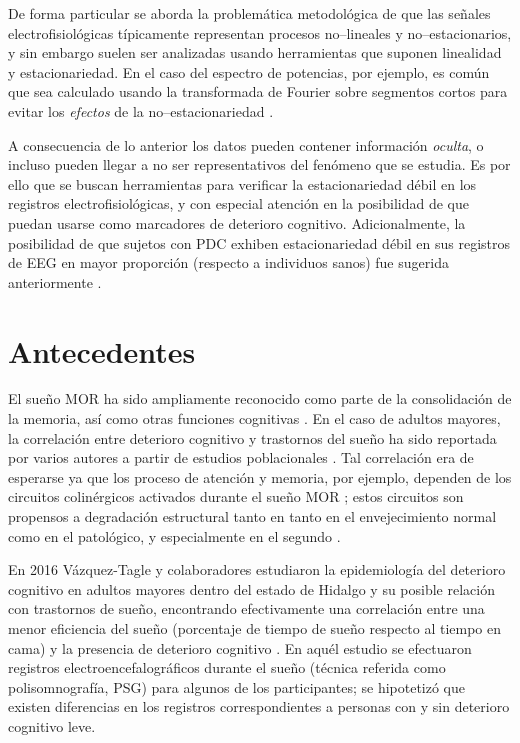 De forma particular se aborda la problemática metodológica de que las señales electrofisiológicas 
típicamente representan procesos no--lineales y no--estacionarios, y sin embargo suelen ser 
analizadas usando herramientas que suponen linealidad y estacionariedad.
%
En el caso del espectro de potencias, por ejemplo, es común que sea calculado usando la
transformada de Fourier sobre segmentos cortos para evitar los \textit{efectos} de la 
no--estacionariedad \cite{Kaiser00}.

A consecuencia de lo anterior los datos pueden contener información \textit{oculta}, o incluso 
pueden llegar a no ser representativos del fenómeno que se estudia. 
%
Es por ello que se buscan herramientas para verificar la estacionariedad débil en los registros
electrofisiológicas, y con especial atención en la posibilidad de que puedan usarse como marcadores
de deterioro cognitivo.
%
Adicionalmente, la posibilidad de que sujetos con PDC exhiben estacionariedad débil en sus 
registros de EEG en mayor proporción (respecto a individuos sanos) fue sugerida anteriormente
\cite{Cohen77}.


\section{Antecedentes}

El sueño MOR ha sido ampliamente reconocido como parte de la consolidación de la memoria, así como
otras funciones cognitivas 
\cite{Fishbein1971,Fishbein1977,Lucero1970,Pearlman1971,Pearlman1974,Smith1991}.
%
En el caso de adultos mayores, la correlación entre deterioro cognitivo y trastornos del sueño ha 
sido reportada por varios autores a partir de estudios poblacionales 
\cite{Amer13,Miyata13,Reid06,Potvin12}.
%
Tal correlación era de esperarse ya que los proceso de atención y memoria, por ejemplo, dependen de 
los circuitos colinérgicos activados durante el sueño MOR \cite{Braun1997}; estos circuitos son 
propensos a degradación estructural tanto en tanto en el envejecimiento normal como en el 
patológico,  y especialmente en el segundo \cite{Schliebs11}.

En 2016 Vázquez-Tagle y colaboradores estudiaron la epidemiología del deterioro cognitivo en 
adultos mayores dentro del estado de Hidalgo y su posible relación con trastornos de sueño, 
encontrando efectivamente una correlación entre una menor eficiencia del sueño (porcentaje de 
tiempo de sueño respecto al tiempo en cama) y la presencia de deterioro cognitivo 
\cite{VazquezTagle16}.
%
En aquél estudio se efectuaron registros electroencefalográficos durante el sueño (técnica referida
como polisomnografía, PSG) para algunos de los participantes; se hipotetizó que existen
diferencias en los registros correspondientes a personas con y sin deterioro cognitivo leve.

